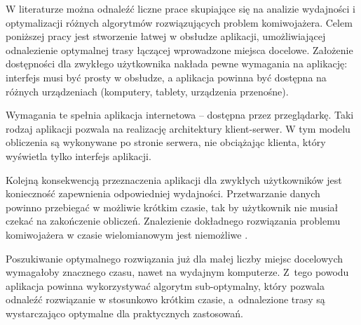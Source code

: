 W literaturze można odnaleźć liczne prace skupiające się na analizie wydajności i optymalizacji różnych algorytmów rozwiązujących problem komiwojażera. Celem poniższej pracy jest stworzenie łatwej w obsłudze aplikacji, umożliwiającej odnalezienie optymalnej trasy łączącej wprowadzone miejsca docelowe. Założenie dostępności dla zwykłego użytkownika nakłada pewne wymagania na aplikację: interfejs musi być prosty w obsłudze, a aplikacja powinna być dostępna na różnych urządzeniach (komputery, tablety, urządzenia przenośne).

Wymagania te spełnia aplikacja internetowa -- dostępna przez przeglądarkę. Taki rodzaj aplikacji pozwala na realizację architektury klient-serwer. W tym modelu obliczenia są wykonywane po stronie serwera, nie obciążając klienta, który wyświetla tylko interfejs aplikacji.

Kolejną konsekwencją przeznaczenia aplikacji dla zwykłych użytkowników jest konieczność zapewnienia odpowiedniej wydajności. Przetwarzanie danych powinno przebiegać w możliwie krótkim czasie, tak by użytkownik nie musiał czekać na zakończenie obliczeń. Znalezienie dokładnego rozwiązania problemu komiwojażera w czasie wielomianowym jest niemożliwe \cite{papadimitriou1977euclidean}.

Poszukiwanie optymalnego rozwiązania już dla małej liczby miejsc docelowych wymagałoby znacznego czasu, nawet na wydajnym komputerze. Z~tego powodu aplikacja powinna wykorzystywać algorytm sub-optymalny, który pozwala odnaleźć rozwiązanie w stosunkowo krótkim czasie, a~odnalezione trasy są wystarczająco optymalne dla praktycznych zastosowań.

